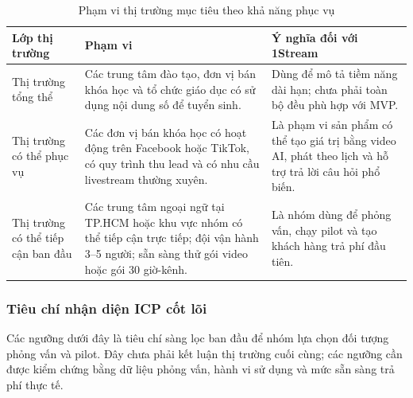 \begin{table}[H]
    \centering
    \small
    \setlength{\tabcolsep}{5pt}
    \renewcommand{\arraystretch}{1.25}
    \caption{Phạm vi thị trường mục tiêu theo khả năng phục vụ}
    \label{tab:tam-sam-som-1stream}
    \begin{tabularx}{\linewidth}{@{}L{2.1cm}Y L{4cm}@{}}
        \toprule
        \textbf{Lớp thị trường} & \textbf{Phạm vi} & \textbf{Ý nghĩa đối với 1Stream} \\ \midrule
        Thị trường tổng thể & Các trung tâm đào tạo, đơn vị bán khóa học và tổ
        chức giáo dục có sử dụng nội dung số để tuyển sinh. &
        Dùng để mô tả tiềm năng dài hạn; chưa phải toàn bộ đều phù hợp với MVP. \\
        Thị trường có thể phục vụ & Các đơn vị bán khóa học có hoạt động trên
        Facebook hoặc TikTok, có quy trình thu lead và có nhu cầu livestream
        thường xuyên. &
        Là phạm vi sản phẩm có thể tạo giá trị bằng video AI, phát theo lịch và
        hỗ trợ trả lời câu hỏi phổ biến. \\
        Thị trường có thể tiếp cận ban đầu & Các trung tâm ngoại ngữ tại
        TP.HCM hoặc khu vực nhóm có thể tiếp cận trực tiếp; đội vận hành 3--5
        người; sẵn sàng thử gói video hoặc gói 30 giờ-kênh. &
        Là nhóm dùng để phỏng vấn, chạy pilot và tạo khách hàng trả phí đầu tiên. \\ \bottomrule
    \end{tabularx}
\end{table}

\subsubsection{Tiêu chí nhận diện ICP cốt lõi}

Các ngưỡng dưới đây là tiêu chí sàng lọc ban đầu để nhóm lựa chọn đối tượng phỏng
vấn và pilot. Đây chưa phải kết luận thị trường cuối cùng; các ngưỡng cần được
kiểm chứng bằng dữ liệu phỏng vấn, hành vi sử dụng và mức sẵn sàng trả phí thực
tế.

